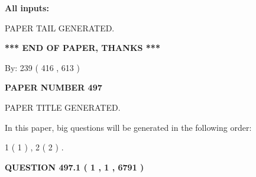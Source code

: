 \documentclass{ctexart}
\begin{document}
   
   
   
\noindent{}
   
   
   
   
\noindent\vspace{0.1in}\hspace{-0.08in} {\textbf{\Large{All inputs: }}}
   
   
   
   
   
   
 \vspace{0.2in}
 
   
   
\vspace{2.0in} PAPER TAIL GENERATED.
   
   
   
   
\vspace{1.0in} 
{\textbf{\large{ *** END OF PAPER, THANKS *** }}} 
   
   
\hspace{1.0in} By: 
 239 ( 416 ,  613 )
   
   
   
   
\newpage 
\setcounter{page}{ 
   497001 } 
   
   
   
   
 {\textbf{ \Large{ PAPER NUMBER  497  }}}
   
   
\vspace{0.2in}
   
   
   
   
   
   
   
   
 \vspace{0.2in}
 
 
 
 
   
   
 PAPER TITLE GENERATED.
   
   
   
\vspace{0.2in}
   
In this paper, big questions will be generated in the following order: 
   
   
   1 ( 1 )
 ,
   2 ( 2 )
 .
  
\vspace{0.2in}
  
{\textbf{\Large{QUESTION
497.1 
 ( 1 , 1 , 6791 )
}}}
  
\end{document}
